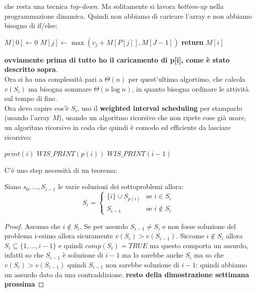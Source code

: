 \documentclass[a4paper,12pt, oneside]{book}
\begin{document}
che resta una tecnica \textit{top-down}. Ma solitamente si lavora
\textit{bottom-up} nella programmazione dinamica. Quindi non abbiamo
di caricare l'array e non abbiamo bisogno di if/else:
\begin{shaded}
  \begin{algorithmic}
    \State $M[0]\gets 0$
    \State $M[j]\gets\max(v_j+M[P[j]], M[J-1])$
    \EndFor
    \State \textbf{return} $M[i]$
    \EndFunction
  \end{algorithmic}  
\end{shaded}
\textbf{ovviamente prima di tutto ho il caricamento di p[i], come è
  stato descritto sopra}.\\
Ora si ha una complessità pari a $\Theta(n)$ per quest'ultimo
algortimo, che calcola $v(S_i)$ ma bisogna sommare $\Theta(n\log n)$,
in quanto bisogna ordinare le attività sul tempo di fine.\\
Ora devo capire cos'è $S_i$, uso il \textbf{weighted interval
  scheduling} per stamparlo (usando l'array $M$), usando un algoritmo
ricorsivo che non ripete cose già usare, un algoritmo ricorsivo in
coda che quindi è comodo ed efficiente da lasciare ricorsivo:
\begin{shaded}
  \begin{algorithmic}
    \State $print(i)$
    \State $WIS\_PRINT(p(i))$
    \Else
    \State $WIS\_PRINT(i-1)$
    \EndIf
    \EndIf
    \EndFunction
  \end{algorithmic}  
\end{shaded}
C'è uno step necessità di un teorema:
\begin{teorema}
  Siano $s_0,\ldots,S_{i-1}$ le varie soluzioni dei sottoproblemi allora:
  \[
    S_i=\begin{cases}
      \{i\}\cup S_{p(i)} & \mbox{se }i\in S_i\\
      S_{i-1} & \mbox{se } i\not\in S_i
    \end{cases}
  \]
\end{teorema}
\begin{proof}
  Assumo che $i\not\in S_i$. Se per assurdo $S_{i-1}\neq S_i$ e non
  fosse soluzione del problema i-esimo allora sicuramente
  $v(S_i)>v(S_{i-1})$. Siccome $i\not\in S_i$ allora
  $S_i\subseteq\{1,\ldots,i-1\}$ e quindi $comp(S_i)=TRUE$ ma questo
  comporta un assurdo, infatti so che $S_{i-1}$ è soluzione di $i-1$
  ma lo sarebbe anche $S_i$ ma so che $v(S_i)>v(S_{i-1})$ quindi
  $S_{i-1}$ non sarebbe soluzione di $i-1$; quindi abbiamo un assurdo
  dato da una contraddizione.
  \textbf{resto della dimostrazione settimana prossima}
\end{proof}
\end{document}
